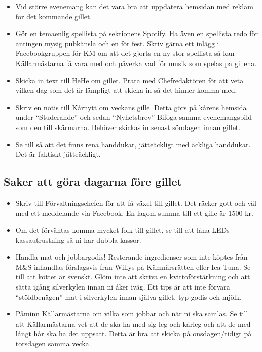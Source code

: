 \documentclass[10pt]{article}
\begin{document}
\begin{itemize}
        \item Vid större evenemang kan det vara bra att uppdatera hemsidan med reklam för det kommande gillet.
        \item Gör en temaenlig spellista på sektionens Spotify. Ha även en spellista redo för antingen mysig pubkänsla och en för fest. Skriv gärna ett inlägg i Facebookgruppen för KM om att det gjorts en ny stor spellista så kan Källarmästarna få vara med och påverka vad för musik som spelas på gillena.
        \item Skicka in text till HeHe om gillet. Prata med Chefredaktören för att veta vilken dag som det är lämpligt att skicka in så det hinner komma med.
        \item Skriv en notis till Kårnytt om veckans gille. Detta görs på kårens hemsida under ``Studerande'' och sedan ``Nyhetsbrev'' Bifoga samma evenemangsbild som den till skärmarna. Behöver skickas in senast söndagen innan gillet.
        \item Se till så att det finns rena handdukar, jätteäckligt med äckliga handdukar. Det är faktiskt jätteäckligt.

    \end{itemize}

    \subsection{Saker att göra dagarna före gillet}
    \begin{itemize}
        \item Skriv till Förvaltningschefen för att få växel till gillet. Det räcker gott och väl med ett meddelande via Facebook. En lagom summa till ett gille är 1500 kr.
        \item Om det förväntas komma mycket folk till gillet, se till att låna LEDs kassautrustning så ni har dubbla kassor.
        \item Handla mat och jobbargodis! Resterande ingredienser som inte köptes från M\&S inhandlas förslagsvis från Willys på Kämnärsrätten eller Ica Tuna. Se till att köttet är svenskt. Glöm inte att skriva en kvittoförstärkning och att sätta igång silverkylen innan ni åker iväg. Ett tips är att inte förvara “stöldbenägen” mat i silverkylen innan själva gillet, typ godis och mjölk.
        \item Påminn Källarmästarna om vilka som jobbar och när ni ska samlas. Se till att Källarmästarna vet att de ska ha med sig leg och kårleg och att de med långt hår ska ha det uppsatt. Detta är bra att skicka på onsdagen/tidigt på torsdagen samma vecka.

    \end{itemize}
\end{document}
